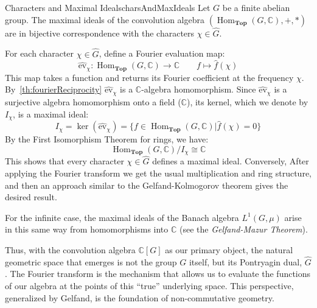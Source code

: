 \documentclass{article}
\newcommand{\C}{{\mathbb{C}}}
\newcommand{\Top}{{\textbf{Top}}}
\newcommand{\Hom}{{\operatorname{Hom}}}
\renewcommand{\mid}{\big|}
\begin{document}
\begin{prop}{Characters and Maximal Ideals}{charsAndMaxIdeals}
    Let $G$ be a finite abelian group. The maximal ideals of the convolution algebra $(\Hom_\Top(G,
	\mathbb{C}), +, *)$ are in bijective correspondence with the characters $\chi \in \widehat{G}$.
\end{prop}

\begin{Proof}
    For each character $\chi \in \widehat{G}$,  define a Fourier evaluation map:
    \[
        \widehat{\text{ev}}_\chi: \Hom_\Top(G, \mathbb{C}) \to \mathbb{C} \qquad f \mapsto \hat{f}(\chi)
    \]
    This map takes a function and returns its Fourier coefficient at the frequency $\chi$.
	By~\ref{th:fourierReciprocity} $\widehat{\text{ev}}_\chi$ is a $\C$-algebra homomorphism. Since
	$\widehat{\text{ev}}_\chi$ is a surjective algebra homomorphism onto a field ($\mathbb{C}$), its kernel,
	which we denote by $I_\chi$, is a maximal ideal:
    \[
        I_\chi = \ker(\widehat{\text{ev}}_\chi) = \{ f \in \Hom_\Top(G, \mathbb{C}) \mid \hat{f}(\chi) = 0 \}
    \]
    By the First Isomorphism Theorem for rings, we have:
    \[
        \Hom_\Top(G, \mathbb{C}) / I_\chi \cong \mathbb{C}
    \]
	This shows that every character $\chi \in \widehat{G}$ defines a maximal ideal. Conversely, After applying
  the Fourier transform we get the usual multiplication and ring structure, and then an approach similar to
  the Gelfand-Kolmogorov theorem gives the desired result.


  For the infinite case, the maximal ideals of the Banach algebra $L^1(G, \mu)$ arise in this same way from
  homomorphisms into $\mathbb{C}$ (see the \emph{Gelfand-Mazur Theorem}).
\end{Proof}

Thus, with the convolution algebra $\mathbb{C}[G]$ as our primary object, the natural geometric space that emerges
is not the group $G$ itself, but its Pontryagin dual, $\widehat{G}$. The Fourier transform is the mechanism
that allows us to evaluate the functions of our algebra at the points of this ``true'' underlying space. This
perspective, generalized by Gelfand, is the foundation of non-commutative geometry.
\end{document}
